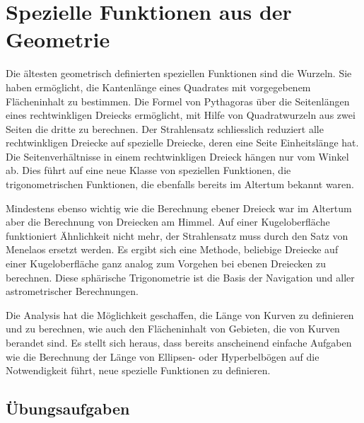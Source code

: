 %
%
%
\chapter{Spezielle Funktionen aus der Geometrie
\label{buch:chapter:geometrie}}
\rhead{}

Die ältesten geometrisch definierten speziellen Funktionen
sind die Wurzeln.
Sie haben ermöglicht, die Kantenlänge eines Quadrates mit vorgegebenem
Flächeninhalt zu bestimmen.
Die Formel von Pythagoras über die Seitenlängen eines rechtwinkligen
Dreiecks ermöglicht, mit Hilfe von Quadratwurzeln aus zwei Seiten
die dritte zu berechnen.
Der Strahlensatz schliesslich reduziert alle rechtwinkligen
Dreiecke auf spezielle Dreiecke, deren eine Seite Einheitslänge 
hat.
Die Seitenverhältnisse in einem rechtwinkligen Dreieck hängen nur 
vom Winkel ab.
Dies führt auf eine neue Klasse von speziellen Funktionen,
die trigonometrischen Funktionen,
die ebenfalls bereits im Altertum bekannt waren.

Mindestens ebenso wichtig wie die Berechnung ebener Dreieck
war im Altertum aber die Berechnung von Dreiecken am Himmel.
Auf einer Kugeloberfläche funktioniert Ähnlichkeit nicht mehr,
der Strahlensatz muss durch den Satz von Menelaos ersetzt werden.
Es ergibt sich eine Methode, beliebige Dreiecke auf einer Kugeloberfläche
ganz analog zum Vorgehen bei ebenen Dreiecken zu berechnen.
Diese sphärische Trigonometrie ist die Basis der Navigation
und aller astrometrischer Berechnungen.

Die Analysis hat die Möglichkeit geschaffen, die Länge von Kurven
zu definieren und zu berechnen, wie auch den Flächeninhalt von
Gebieten, die von Kurven berandet sind.
Es stellt sich heraus, dass bereits anscheinend einfache Aufgaben
wie die Berechnung der Länge von Ellipsen- oder Hyperbelbögen auf
die Notwendigkeit führt, neue spezielle Funktionen zu definieren.







\section*{Übungsaufgaben}
\begin{uebungsaufgaben}
\end{uebungsaufgaben}


